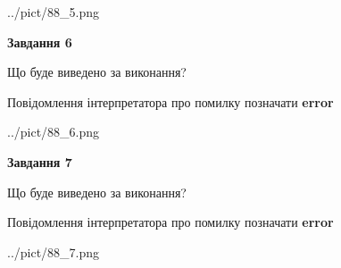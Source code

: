 \documentclass[10pt, ukrainian]{article}
\begin{document}
{\begin {large}
\begin{center}
	{../pict/88_5.png}
\end{center}
\newpage

{\begin {center}\textbf{Завдання 6}\end {center}}\par
Що буде виведено за виконання? \par
Повідомлення інтерпретатора про помилку позначати \textbf{error}

\begin{center}
	{../pict/88_6.png}
\end{center}
\newpage

{\begin {center}\textbf{Завдання 7}\end {center}}\par
Що буде виведено за виконання? \par
Повідомлення інтерпретатора про помилку позначати \textbf{error}

\begin{center}
	{../pict/88_7.png}
\end{center}
\newpage

\end {large}}
\end{document}
